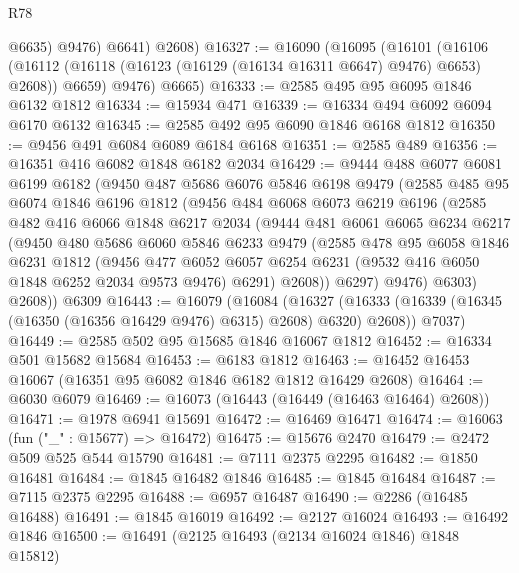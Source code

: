 \begin{lexlean}{R78}
\begin{coremodule}
            @6635)
          @9476)
        @6641)
      @2608)
@16327 := @16090
    (@16095
      (@16101
        (@16106 (@16112 (@16118 (@16123 (@16129 (@16134 @16311 @6647) @9476) @6653) @2608)) @6659)
        @9476)
      @6665)
@16333 := @2585 @495 @95 @6095 @1846 @6132 @1812
@16334 := @15934 @471
@16339 := @16334 @494 @6092 @6094 @6170 @6132
@16345 := @2585 @492 @95 @6090 @1846 @6168 @1812
@16350 := @9456 @491 @6084 @6089 @6184 @6168
@16351 := @2585 @489
@16356 := @16351 @416 @6082 @1848 @6182 @2034
@16429 := @9444
    @488
    @6077
    @6081
    @6199
    @6182
    (@9450
      @487
      @5686
      @6076
      @5846
      @6198
      @9479
      (@2585
        @485
        @95
        @6074
        @1846
        @6196
        @1812
        (@9456
          @484
          @6068
          @6073
          @6219
          @6196
          (@2585
            @482
            @416
            @6066
            @1848
            @6217
            @2034
            (@9444
              @481
              @6061
              @6065
              @6234
              @6217
              (@9450
                @480
                @5686
                @6060
                @5846
                @6233
                @9479
                (@2585
                  @478
                  @95
                  @6058
                  @1846
                  @6231
                  @1812
                  (@9456
                    @477
                    @6052
                    @6057
                    @6254
                    @6231
                    (@9532 @416 @6050 @1848 @6252 @2034 @9573 @9476)
                    @6291)
                  @2608))
              @6297)
            @9476)
          @6303)
        @2608))
    @6309
@16443 := @16079
    (@16084
      (@16327 (@16333 (@16339 (@16345 (@16350 (@16356 @16429 @9476) @6315) @2608) @6320) @2608))
      @7037)
@16449 := @2585 @502 @95 @15685 @1846 @16067 @1812
@16452 := @16334 @501 @15682 @15684
@16453 := @6183 @1812
@16463 := @16452 @16453 @16067 (@16351 @95 @6082 @1846 @6182 @1812 @16429 @2608)
@16464 := @6030 @6079
@16469 := @16073 (@16443 (@16449 (@16463 @16464) @2608))
@16471 := @1978 @6941 @15691
@16472 := @16469 @16471
@16474 := @16063 (fun ("_" : @15677) => @16472)
@16475 := @15676 @2470
@16479 := @2472 @509 @525 @544 @15790
@16481 := @7111 @2375 @2295
@16482 := @1850 @16481
@16484 := @1845 @16482 @1846
@16485 := @1845 @16484
@16487 := @7115 @2375 @2295
@16488 := @6957 @16487
@16490 := @2286 (@16485 @16488)
@16491 := @1845 @16019
@16492 := @2127 @16024
@16493 := @16492 @1846
@16500 := @16491 (@2125 @16493 (@2134 @16024 @1846) @1848 @15812)

\end{coremodule}
\end{lexlean}
